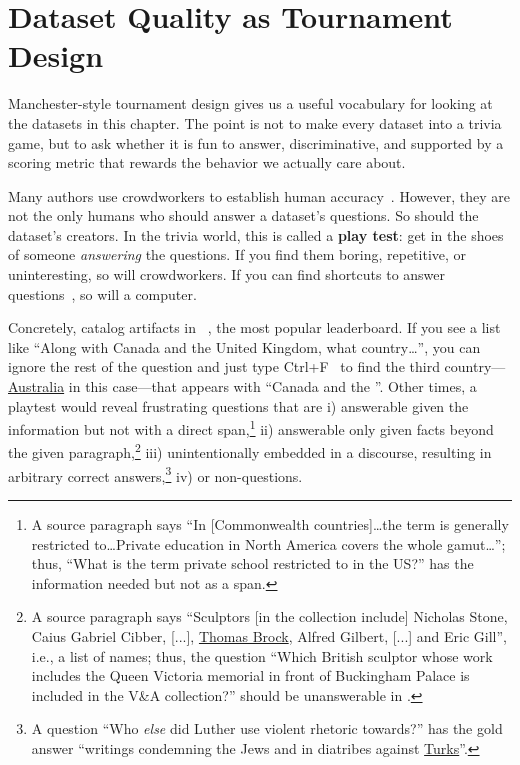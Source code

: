 
\section{Dataset Quality as Tournament Design}

Manchester-style tournament design gives us a useful vocabulary for looking at
the datasets in this chapter. The point is not to make every dataset into a
trivia game, but to ask whether it is fun to answer, discriminative, and
supported by a scoring metric that rewards the behavior we actually care about.

Many authors use crowdworkers to establish human accuracy~\citep{rajpurkar-16,choi-18}.
However, they are not the only humans who should answer a dataset's questions.
So should the dataset's creators. In the trivia world, this is called a {\bf
play test}: get in the shoes of someone \emph{answering} the questions. If you
find them boring, repetitive, or uninteresting, so will crowdworkers. If you can
find shortcuts to answer questions~\citep{rondeau-18,kaushik-18}, so will a
computer.

Concretely, \citet{weissenborn-17} catalog artifacts in \squad{}~\citep{rajpurkar-18},
the most popular  leaderboard. If you see a list like ``Along with
Canada and the United Kingdom, what country\dots'', you can ignore the rest of
the question and just type Ctrl+F~\citep{yuan-19,russell-20} to find the third
country---\underline{Australia} in this case---that appears with ``Canada and
the ''. Other times, a \squad{} playtest would reveal frustrating
questions that are i) answerable given the information but not with a direct
span,\footnote{A source paragraph says ``In [Commonwealth countries]\dots the
term is generally restricted to\dots Private education in North America covers
the whole gamut\dots''; thus, ``What is the term private school restricted to
in the US?'' has the information needed but not as a span.}
ii) answerable only given facts beyond the given paragraph,\footnote{A source
paragraph says ``Sculptors [in the collection include] Nicholas Stone, Caius
Gabriel Cibber, [...], \underline{Thomas Brock}, Alfred Gilbert, [...] and Eric
Gill'', i.e., a list of names; thus, the question ``Which British sculptor
whose work includes the Queen Victoria memorial in front of Buckingham Palace
is included in the V\&A collection?'' should be unanswerable in \squad{}.}
iii) unintentionally embedded in a discourse, resulting in arbitrary correct
answers,\footnote{A question ``Who \emph{else} did Luther use violent rhetoric
towards?'' has the gold answer ``writings condemning the Jews and in diatribes
against \underline{Turks}''.} iv) or non-questions.

